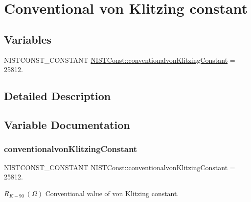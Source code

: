 \hypertarget{group___n_i_s_t_const-_conventionalvon_klitzing_constant}{}\section{Conventional von Klitzing constant}
\label{group___n_i_s_t_const-_conventionalvon_klitzing_constant}
\subsection*{Variables}
\begin{DoxyCompactItemize}
\item 
N\+I\+S\+T\+C\+O\+N\+S\+T\+\_\+\+C\+O\+N\+S\+T\+A\+NT \mbox{\hyperlink{group___n_i_s_t_const-_conventionalvon_klitzing_constant_ga939418415f337c3a3a375d946199cfb0}{N\+I\+S\+T\+Const\+::conventionalvon\+Klitzing\+Constant}} = 25812.
\end{DoxyCompactItemize}


\subsection{Detailed Description}


\subsection{Variable Documentation}
\mbox{\label{group___n_i_s_t_const-_conventionalvon_klitzing_constant_ga939418415f337c3a3a375d946199cfb0}} 
\subsubsection{\texorpdfstring{conventionalvon\+Klitzing\+Constant}{conventionalvonKlitzingConstant}}
{\footnotesize\ttfamily N\+I\+S\+T\+C\+O\+N\+S\+T\+\_\+\+C\+O\+N\+S\+T\+A\+NT N\+I\+S\+T\+Const\+::conventionalvon\+Klitzing\+Constant = 25812.}

$R_{K-90} \ (\Omega)$ Conventional value of von Klitzing constant. 